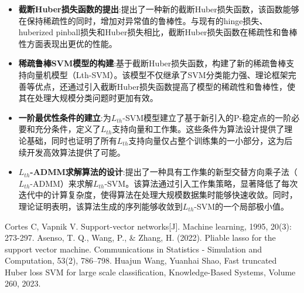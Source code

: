 \documentclass[12pt]{article}  %
\begin{document}
\begin{itemize}
	\setlength{\parsep}{0ex} %
	\setlength{\topsep}{2ex} %
	\setlength{\itemsep}{1ex} %
	\item \textbf{截断Huber损失函数的提出}:提出了一种新的截断Huber损失函数，该函数能够在保持稀疏性的同时，增加对异常值的鲁棒性。与现有的hinge损失、huberized pinball损失和Huber损失相比，截断Huber损失函数在稀疏性和鲁棒性方面表现出更优的性能。
	\item \textbf{稀疏鲁棒SVM模型的构建}:基于截断Huber损失函数，构建了新的稀疏鲁棒支持向量机模型（Lth-SVM）。该模型不仅继承了SVM分类能力强、理论框架完善等优点，还通过引入截断Huber损失函数提高了模型的稀疏性和鲁棒性，使其在处理大规模分类问题时更加有效。
	\item \textbf{一阶最优性条件的建立}:为$L_{th}$-SVM模型建立了基于新引入的P-稳定点的一阶必要和充分条件，定义了$L_{th}$支持向量和工作集。这些条件为算法设计提供了理论基础，同时也证明了所有$L_{th}$支持向量仅占整个训练集的一小部分，这为后续开发高效算法提供了可能。
	\item \textbf{$L_{th}$-ADMM求解算法的设计}:提出了一种具有工作集的新型交替方向乘子法（$L_{th}$-ADMM）来求解$L_{th}$-SVM。该算法通过引入工作集策略，显著降低了每次迭代中的计算复杂度，使得算法在处理大规模数据集时能够快速收敛。同时，理论证明表明，该算法生成的序列能够收敛到$L_{th}$-SVM的一个局部极小值。
\end{itemize}

\begin{thebibliography}{99}
	 Cortes C, Vapnik V. Support-vector networks[J]. Machine learning, 1995, 20(3): 273-297.
	 Asenso, T. Q., Wang, P., \& Zhang, H. (2022). Pliable lasso for the support vector machine. Communications in Statistics - Simulation and Computation, 53(2), 786–798.
	 Huajun Wang, Yuanhai Shao, Fast truncated Huber loss SVM for large scale classification,	Knowledge-Based Systems, Volume 260, 2023.
\end{thebibliography}
\end{document}
